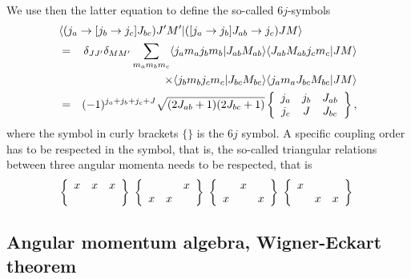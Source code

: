 \documentclass[%
twoside,                 %
final,                   %
10pt]{article}
\begin{document}
\paragraph{}
We use then the latter equation to define the so-called $6j$-symbols
\begin{eqnarray}
\nonumber
\lefteqn{ \langle (j_a\rightarrow [j_b\rightarrow j_c]J_{bc}) J'M'| ([j_a\rightarrow j_b]J_{ab}\rightarrow j_c) JM\rangle } \\ \nonumber
&= & \delta_{JJ'}\delta_{MM'}\sum_{m_am_bm_c}\langle j_am_aj_bm_b|J_{ab}M_{ab}\rangle \langle J_{ab}M_{ab}j_cm_c|JM\rangle \\ \nonumber
& &  \times \langle j_bm_bj_cm_c|J_{bc}M_{bc}\rangle \langle j_am_aJ_{bc}M_{bc}|JM\rangle  \\ \nonumber
&= & (-1)^{j_a+j_b+j_c+J}\sqrt{(2J_{ab}+1)(2J_{bc}+1)}\left\{\begin{array}{ccc} j_a & j_b& J_{ab} \\ j_c & J & J_{bc} \end{array}\right\}
, \nonumber
\end{eqnarray}
where the symbol in curly brackets $\{\}$ is the $6j$ symbol. 
A specific coupling order has to be respected in the symbol, that is, the so-called triangular relations between three angular momenta needs to be respected, that is 
\[
\left\{\begin{array}{ccc} x & x& x \\  &  &  \end{array}\right\}\hspace{0.1cm}\left\{\begin{array}{ccc}  & & x \\  x& x &  \end{array}\right\}\hspace{0.1cm}\left\{\begin{array}{ccc}  & x&  \\ x &  &x  \end{array}\right\}\hspace{0.1cm}\left\{\begin{array}{ccc} x & &  \\  & x &x  \end{array}\right\}\hspace{0.1cm}
\]



\subsection{Angular momentum algebra, Wigner-Eckart theorem}
\end{document}
